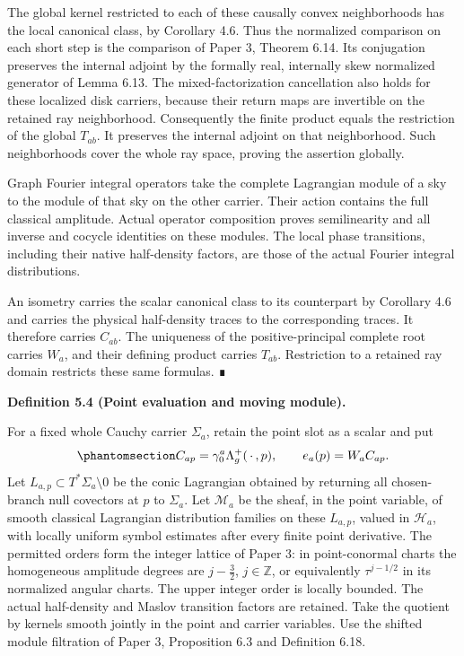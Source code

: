 \documentclass[
  english,
  11pt,
  reqno]{amsart}
\makeatletter
\newcommand{\pandocstatementheading}[1]{%
  \par\if@nobreak\else
    \addpenalty{\@beginparpenalty}%
    \addvspace{.5\baselineskip plus .2\baselineskip minus .2\baselineskip}%
  \fi
  {\normalfont\bfseries #1\par}%
  \nobreak\@afterindenttrue\@afterheading
}
\makeatother
\begin{document}
The global kernel restricted to each of these causally convex
neighborhoods has the local canonical class, by Corollary 4.6. Thus the
normalized comparison on each short step is the comparison of Paper 3,
Theorem 6.14. Its conjugation preserves the internal adjoint by the
formally real, internally skew normalized generator of Lemma 6.13. The
mixed-factorization cancellation also holds for these localized disk
carriers, because their return maps are invertible on the retained ray
neighborhood. Consequently the finite product equals the restriction of
the global \(T_{ab}\). It preserves the internal adjoint on that
neighborhood. Such neighborhoods cover the whole ray space, proving the
assertion globally.

Graph Fourier integral operators take the complete Lagrangian module of
a sky to the module of that sky on the other carrier. Their action
contains the full classical amplitude. Actual operator composition
proves semilinearity and all inverse and cocycle identities on these
modules. The local phase transitions, including their native
half-density factors, are those of the actual Fourier integral
distributions.

An isometry carries the scalar canonical class to its counterpart by
Corollary 4.6 and carries the physical half-density traces to the
corresponding traces. It therefore carries \(C_{ab}\). The uniqueness of
the positive-principal complete root carries \(W_a\), and their defining
product carries \(T_{ab}\). Restriction to a retained ray domain
restricts these same formulas. ∎

\pandocstatementheading{\protect{}\label{def:global-point-evaluation}Definition 5.4 (Point evaluation and moving module).}

For a fixed whole Cauchy carrier \(\Sigma_a\), retain the point slot as
a scalar and put
\begin{equation}\protect\phantomsection\label{eq:global-point-evaluation}{
C_{ap}=\gamma_0^a\Lambda_g^+(\,\cdot\,,p),
\qquad e_a(p)=W_aC_{ap}.
}\end{equation} Let \(L_{a,p}\subset T^*\Sigma_a\setminus0\) be the
conic Lagrangian obtained by returning all chosen-branch null covectors
at \(p\) to \(\Sigma_a\). Let \(\mathscr M_a\) be the sheaf, in the
point variable, of smooth classical Lagrangian distribution families on
these \(L_{a,p}\), valued in \(\mathcal H_a\), with locally uniform
symbol estimates after every finite point derivative. The permitted
orders form the integer lattice of Paper 3: in point-conormal charts the
homogeneous amplitude degrees are \(j-\tfrac32\), \(j\in\mathbb Z\), or
equivalently \(\tau^{j-1/2}\) in its normalized angular charts. The
upper integer order is locally bounded. The actual half-density and
Maslov transition factors are retained. Take the quotient by kernels
smooth jointly in the point and carrier variables. Use the shifted
module filtration of Paper 3, Proposition 6.3 and Definition 6.18.
\end{document}
